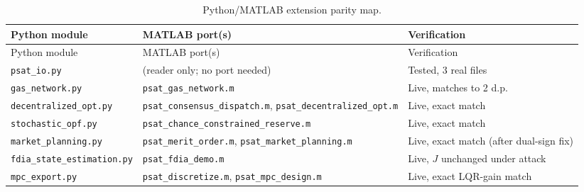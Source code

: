 \documentclass[11pt]{report}
\newcommand{\pkg}[1]{\texttt{#1}}
\theoremstyle{plain}
\theoremstyle{definition}
\theoremstyle{remark}
\begin{document}
\begin{longtable}{@{}p{5cm}p{5.5cm}p{4cm}@{}}
\caption{Python/MATLAB extension parity map.}
\label{tab:parity}\\
\toprule
Python module & MATLAB port(s) & Verification \\
\midrule
\endfirsthead
\toprule
Python module & MATLAB port(s) & Verification \\
\midrule
\endhead
\pkg{psat\_\hspace{0pt}io.py} & (reader only; no port needed) & Tested, 3 real files \\
\pkg{gas\_\hspace{0pt}network.py} & \pkg{psat\_\hspace{0pt}gas\_\hspace{0pt}network.m} & Live, matches to 2 d.p. \\
\pkg{decentralized\_\hspace{0pt}opt.py} & \pkg{psat\_\hspace{0pt}consensus\_\hspace{0pt}dispatch.m}, \pkg{psat\_\hspace{0pt}decentralized\_\hspace{0pt}opt.m} & Live, exact match \\
\pkg{stochastic\_\hspace{0pt}opf.py} & \pkg{psat\_\hspace{0pt}chance\_\hspace{0pt}constrained\_\hspace{0pt}reserve.m} & Live, exact match \\
\pkg{market\_\hspace{0pt}planning.py} & \pkg{psat\_\hspace{0pt}merit\_\hspace{0pt}order.m}, \pkg{psat\_\hspace{0pt}market\_\hspace{0pt}planning.m} & Live, exact match (after dual-sign fix) \\
\pkg{fdia\_\hspace{0pt}state\_\hspace{0pt}estimation.py} & \pkg{psat\_\hspace{0pt}fdia\_\hspace{0pt}demo.m} & Live, $J$ unchanged under attack \\
\pkg{mpc\_\hspace{0pt}export.py} & \pkg{psat\_\hspace{0pt}discretize.m}, \pkg{psat\_\hspace{0pt}mpc\_\hspace{0pt}design.m} & Live, exact LQR-gain match \\

\end{longtable}
\end{document}
